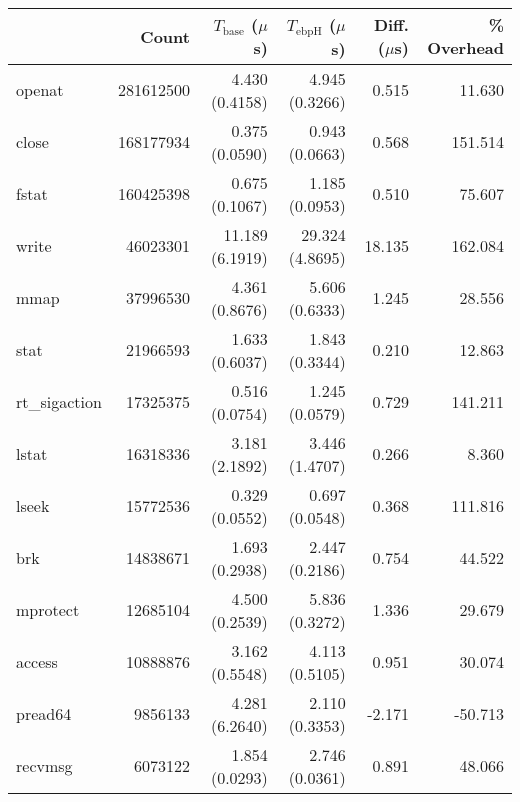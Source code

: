 \begin{tabular}{>{\ttfamily}lrrrrr}
\toprule
\multicolumn{1}{l}{System Call} &      Count & $T_\text{base}$ ($\mu$s) & $T_\text{ebpH}$ ($\mu$s) &  Diff. ($\mu$s) &  \% Overhead \\
\midrule
                         openat &  281612500 &           4.430 (0.4158) &           4.945 (0.3266) &           0.515 &       11.630 \\
                          close &  168177934 &           0.375 (0.0590) &           0.943 (0.0663) &           0.568 &      151.514 \\
                          fstat &  160425398 &           0.675 (0.1067) &           1.185 (0.0953) &           0.510 &       75.607 \\
                          write &   46023301 &          11.189 (6.1919) &          29.324 (4.8695) &          18.135 &      162.084 \\
                           mmap &   37996530 &           4.361 (0.8676) &           5.606 (0.6333) &           1.245 &       28.556 \\
                           stat &   21966593 &           1.633 (0.6037) &           1.843 (0.3344) &           0.210 &       12.863 \\
                  rt\_sigaction &   17325375 &           0.516 (0.0754) &           1.245 (0.0579) &           0.729 &      141.211 \\
                          lstat &   16318336 &           3.181 (2.1892) &           3.446 (1.4707) &           0.266 &        8.360 \\
                          lseek &   15772536 &           0.329 (0.0552) &           0.697 (0.0548) &           0.368 &      111.816 \\
                            brk &   14838671 &           1.693 (0.2938) &           2.447 (0.2186) &           0.754 &       44.522 \\
                       mprotect &   12685104 &           4.500 (0.2539) &           5.836 (0.3272) &           1.336 &       29.679 \\
                         access &   10888876 &           3.162 (0.5548) &           4.113 (0.5105) &           0.951 &       30.074 \\
                        pread64 &    9856133 &           4.281 (6.2640) &           2.110 (0.3353) &          -2.171 &      -50.713 \\
                        recvmsg &    6073122 &           1.854 (0.0293) &           2.746 (0.0361) &           0.891 &       48.066 \\

\end{tabular}

